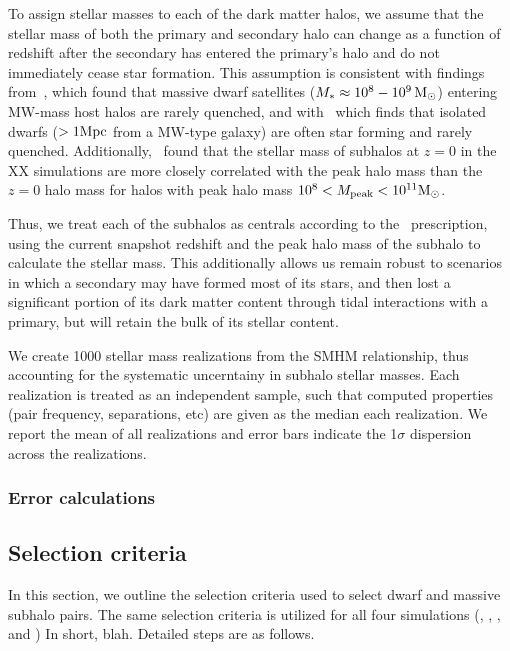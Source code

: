 \documentclass[twocolumn]{aastex631}
\begin{document}
To assign stellar masses to each of the dark matter halos, we assume that the stellar mass of both the primary and secondary halo can change as a function of redshift after the secondary has entered the primary's halo and do not immediately cease star formation.
This assumption is consistent with findings from~\cite{Akins2021}, which found that massive dwarf satellites ($M_*\approx 10^8-10^9\, \mathrm{M}_\odot$) entering MW-mass host halos are rarely quenched, and with~\cite{geha13} which finds that isolated dwarfs ($>1\mathrm{Mpc}$ from a MW-type galaxy) are often star forming and rarely quenched.
Additionally,~\citet{Munshi2021} found that the stellar mass of subhalos at $z=0$ in the XX simulations are more closely correlated with the peak halo mass than the $z=0$ halo mass for halos with peak halo mass $10^8<M_{\rm peak}<10^{11} \mathrm{M}_\odot$. 

Thus, we treat each of the subhalos as centrals according to the~\citet{Moster2013} prescription, using the current snapshot redshift and the peak halo mass of the subhalo to calculate the stellar mass. 
This additionally allows us remain robust to scenarios in which a secondary may have formed most of its stars, and then lost a significant portion of its dark matter content through tidal interactions with a primary, but will retain the bulk of its stellar content.

We create 1000 stellar mass realizations from the SMHM relationship, thus accounting for the systematic uncerntainy in subhalo stellar masses. Each realization is treated as an independent sample, such that computed properties (pair frequency, separations, etc) are given as the median each realization. We report the mean of all realizations and error bars indicate the 1$\sigma$ dispersion across the realizations.

\subsubsection{Error calculations}\label{sec:methods-err}


\subsection{Selection criteria}\label{sec:methods-crit}
In this section, we outline the selection criteria used to select dwarf and massive subhalo pairs. 
The same selection criteria is utilized for all four simulations (\illd, \illh, \tngd, and \tngh)
In short, blah. 
Detailed steps are as follows. 
\end{document}
